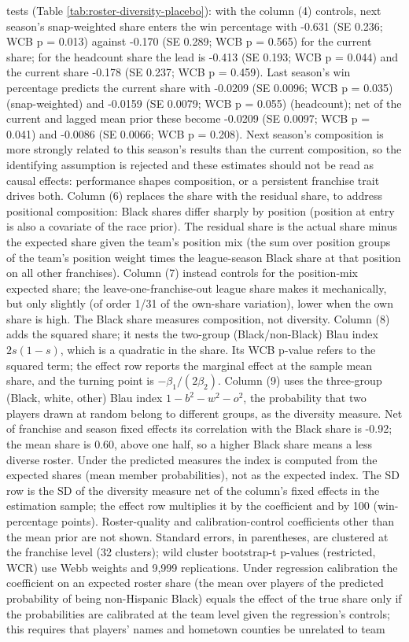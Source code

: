\begin{table}[!h]
{\begin{threeparttable}
\begin{tablenotes}[para]
tests (Table \ref{tab:roster-diversity-placebo}): with the column (4) controls, next season's snap-weighted share enters the win percentage with -0.631 (SE 0.236; WCB p = 0.013) against -0.170 (SE 0.289; WCB p = 0.565) for the current share; for the headcount share the lead is -0.413 (SE 0.193; WCB p = 0.044) and the current share -0.178 (SE 0.237; WCB p = 0.459). Last season's win percentage predicts the current share with -0.0209 (SE 0.0096; WCB p = 0.035) (snap-weighted) and -0.0159 (SE 0.0079; WCB p = 0.055) (headcount); net of the current and lagged mean prior these become -0.0209 (SE 0.0097; WCB p = 0.041) and -0.0086 (SE 0.0066; WCB p = 0.208). Next season's composition is more strongly related to this season's results than the current composition, so the identifying assumption is rejected and these estimates should not be read as causal effects: performance shapes composition, or a persistent franchise trait drives both. Column (6) replaces the share with the residual share, to address positional composition: Black shares differ sharply by position (position at entry is also a covariate of the race prior). The residual share is the actual share minus the expected share given the team's position mix (the sum over position groups of the team's position weight times the league-season Black share at that position on all other franchises). Column (7) instead controls for the position-mix expected share; the leave-one-franchise-out league share makes it mechanically, but only slightly (of order 1/31 of the own-share variation), lower when the own share is high. The Black share measures composition, not diversity. Column (8) adds the squared share; it nests the two-group (Black/non-Black) Blau index $2s(1-s)$, which is a quadratic in the share. Its WCB p-value refers to the squared term; the effect row reports the marginal effect at the sample mean share, and the turning point is $-\beta_1/(2\beta_2)$. Column (9) uses the three-group (Black, white, other) Blau index $1 - b^2 - w^2 - o^2$, the probability that two players drawn at random belong to different groups, as the diversity measure. Net of franchise and season fixed effects its correlation with the Black share is -0.92; the mean share is 0.60, above one half, so a higher Black share means a less diverse roster. Under the predicted measures the index is computed from the expected shares (mean member probabilities), not as the expected index. The SD row is the SD of the diversity measure net of the column's fixed effects in the estimation sample; the effect row multiplies it by the coefficient and by 100 (win-percentage points). Roster-quality and calibration-control coefficients other than the mean prior are not shown. Standard errors, in parentheses, are clustered at the franchise level (32 clusters); wild cluster bootstrap-t p-values (restricted, WCR) use Webb weights and 9,999 replications. Under regression calibration the coefficient on an expected roster share (the mean over players of the predicted probability of being non-Hispanic Black) equals the effect of the true share only if the probabilities are calibrated at the team level given the regression's controls; this requires that players' names and hometown counties be unrelated to team 
\end{tablenotes}
\end{threeparttable}}
\end{table}
